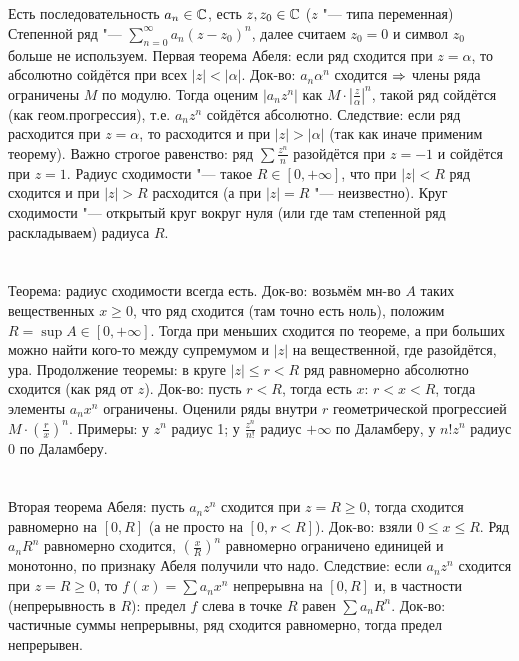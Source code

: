 \section{} %
Есть последовательность $a_n \in \mathbb{C}$, есть $z, z_0 \in \mathbb{C}$ ($z$ "--- типа переменная)
Степенной ряд "--- $\sum_{n=0}^\infty a_n(z-z_0)^n$, далее считаем $z_0=0$ и символ $z_0$ больше не используем.
Первая теорема Абеля: если ряд сходится при $z=\alpha$, то абсолютно сойдётся при всех $|z|<|\alpha|$.
Док-во: $a_n\alpha^n$ сходится $\Rightarrow$ члены ряда ограничены $M$ по модулю.
Тогда оценим $|a_nz^n|$ как $M\cdot|\frac{z}{\alpha}|^n$, такой ряд сойдётся (как геом.прогрессия), т.е.
$a_nz^n$ сойдётся абсолютно.
Следствие: если ряд расходится при $z=\alpha$, то расходится и при $|z|>|\alpha|$ (так как иначе применим теорему).
Важно строгое равенство: ряд $\sum \frac{z^n}{n}$ разойдётся при $z=-1$ и сойдётся при $z=1$.
Радиус сходимости "--- такое $R \in [0, +\infty]$, что при $|z| < R$ ряд сходится и при $|z| > R$ расходится
(а при $|z|=R$ "--- неизвестно).
Круг сходимости "--- открытый круг вокруг нуля (или где там степенной ряд раскладываем) радиуса $R$.

\section{} %
Теорема: радиус сходимости всегда есть.
Док-во: возьмём мн-во $A$ таких вещественных $x \ge 0$, что ряд сходится (там точно есть ноль), положим
$R=\sup A \in [0, +\infty]$.
Тогда при меньших сходится по теореме, а при больших можно найти кого-то между супремумом и $|z|$ на вещественной, где разойдётся, ура.
Продолжение теоремы: в круге $|z| \le r < R$ ряд равномерно абсолютно сходится (как ряд от $z$).
Док-во: пусть $r<R$, тогда есть $x$: $r<x<R$, тогда элементы $a_nx^n$ ограничены.
Оценили ряды внутри $r$ геометрической прогрессией $M\cdot (\frac{r}{x})^n$.
Примеры: у $z^n$ радиус 1; у $\frac{z^n}{n!}$ радиус $+\infty$ по Даламберу, у $n!z^n$ радиус 0 по Даламберу.

\section{} %
Вторая теорема Абеля: пусть $a_nz^n$ сходится при $z=R\ge0$, тогда сходится равномерно на $[0,R]$ (а не просто на $[0, r<R]$).
Док-во: взяли $0 \le x \le R$.
Ряд $a_nR^n$ равномерно сходится, $(\frac x R)^n$ равномерно ограничено единицей и монотонно, по признаку Абеля получили что надо.
Следствие: если $a_nz^n$ сходится при $z=R \ge 0$, то $f(x) = \sum a_nx^n$ непрерывна на $[0, R]$ и, в частности
(непрерывность в $R$): предел $f$ слева в точке $R$ равен $\sum a_nR^n$.
Док-во: частичные суммы непрерывны, ряд сходится равномерно, тогда предел непрерывен.

